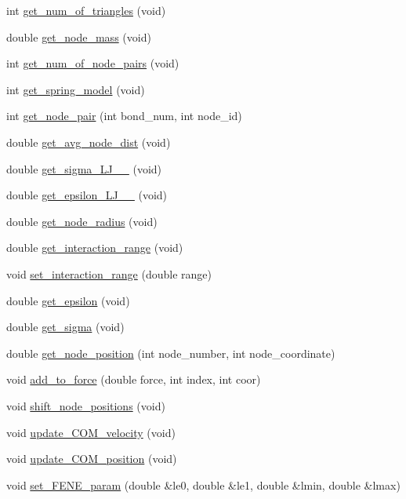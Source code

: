 \begin{DoxyCompactItemize}
int \mbox{\hyperlink{classECM_a7e30f13a497b78851fa165609c20344b}{get\+\_\+num\+\_\+of\+\_\+triangles}} (void)
\item 
double \mbox{\hyperlink{classECM_a5ae07f6f6a367dc6ebac42387ad8edd2}{get\+\_\+node\+\_\+mass}} (void)
\item 
int \mbox{\hyperlink{classECM_aadeaefad8e0e1ca296249ed4c8a5ade9}{get\+\_\+num\+\_\+of\+\_\+node\+\_\+pairs}} (void)
\item 
int \mbox{\hyperlink{classECM_ab45a4d7d1d71a4bd6ca1403f9d794203}{get\+\_\+spring\+\_\+model}} (void)
\item 
int \mbox{\hyperlink{classECM_a97b1c4fbfa1158752369ed3e1c8f2f59}{get\+\_\+node\+\_\+pair}} (int bond\+\_\+num, int node\+\_\+id)
\item 
double \mbox{\hyperlink{classECM_ab8d8c6f37cbbf963cad176bfd5c45658}{get\+\_\+avg\+\_\+node\+\_\+dist}} (void)
\item 
double \mbox{\hyperlink{classECM_a9116e5b74b658291d070c03f0a74715c}{get\+\_\+sigma\+\_\+\+L\+J\+\_\+\_}} (void)
\item 
double \mbox{\hyperlink{classECM_a740df2034bc69bb26c6ba1780f644329}{get\+\_\+epsilon\+\_\+\+L\+J\+\_\+\_}} (void)
\item 
double \mbox{\hyperlink{classECM_a59c396242e1f2a7992bcb3744c27d280}{get\+\_\+node\+\_\+radius}} (void)
\item 
double \mbox{\hyperlink{classECM_af36525691755fc391410e3784fe44113}{get\+\_\+interaction\+\_\+range}} (void)
\item 
void \mbox{\hyperlink{classECM_a9c4ea9febf2771ef222cd1430c3bf136}{set\+\_\+interaction\+\_\+range}} (double range)
\item 
double \mbox{\hyperlink{classECM_a0ce08b5de6aebfe790a0a6a9967d832c}{get\+\_\+epsilon}} (void)
\item 
double \mbox{\hyperlink{classECM_ab955084115d90d0410add1906b4efe85}{get\+\_\+sigma}} (void)
\item 
double \mbox{\hyperlink{classECM_a7c17fccf4d4f8165a7dceee20c81433d}{get\+\_\+node\+\_\+position}} (int node\+\_\+number, int node\+\_\+coordinate)
\item 
void \mbox{\hyperlink{classECM_a5ecaa9b089745b130c510aedbaea18e0}{add\+\_\+to\+\_\+force}} (double force, int index, int coor)
\item 
void \mbox{\hyperlink{classECM_a27b1c92c5a5d332698d7ae7cad1c36e4}{shift\+\_\+node\+\_\+positions}} (void)
\item 
void \mbox{\hyperlink{classECM_a7272481293ee528878aeb669343bcd4f}{update\+\_\+\+C\+O\+M\+\_\+velocity}} (void)
\item 
void \mbox{\hyperlink{classECM_a492d0690a480a0f0fdfcef3ef35bc970}{update\+\_\+\+C\+O\+M\+\_\+position}} (void)
\item 
void \mbox{\hyperlink{classECM_a434a26d9e696995b20642a5e87c2f0c2}{set\+\_\+\+F\+E\+N\+E\+\_\+param}} (double \&le0, double \&le1, double \&lmin, double \&lmax)
\end{DoxyCompactItemize}
